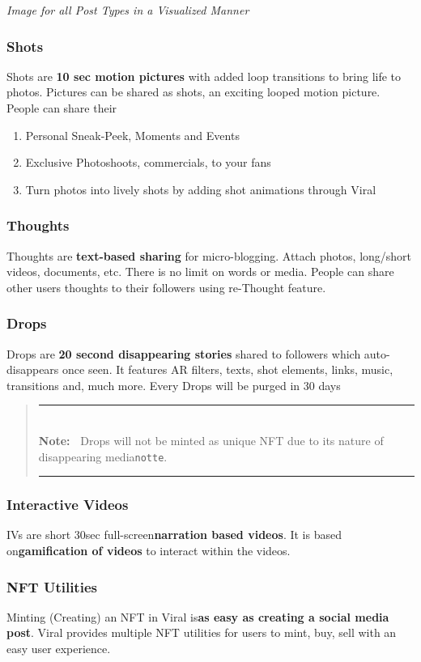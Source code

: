 \documentclass[10pt]{article}
\newlength{\Lnote}
\newcommand{\notte}[1]
     {\addtolength{\leftmargini}{1em}
        \settowidth{\Lnote}{\textbf{Note:~}}
        \begin{quote}
            \rule{\dimexpr\textwidth-2\leftmargini}{1pt}\\
                        \mbox{}\hspace{-\Lnote}\textbf{Note:~}%
                                            #1\\[-0.5ex] 
            \rule{\dimexpr\textwidth-2\leftmargini}{1pt}
        \end{quote}
        \addtolength{\leftmargini}{-4em}}
\begin{document}
\textit{Image for all Post Types in a Visualized Manner}

\subsubsection{Shots}

Shots are \textbf{10 sec motion pictures} with added loop transitions to bring life to photos. Pictures can be shared as shots, an exciting looped motion picture.\\

People can share their
\begin{enumerate}
\item Personal Sneak-Peek, Moments and Events
\item Exclusive Photoshoots, commercials, to your fans
\item Turn photos into lively shots by adding shot animations through Viral
\end{enumerate}

\subsubsection{Thoughts}
Thoughts are \textbf{text-based sharing} for micro-blogging. Attach photos, long/short videos, documents, etc. There is no limit on words or media. People can share other users thoughts to their followers using re-Thought feature.

\subsubsection{Drops}
Drops are \textbf{20 second disappearing stories} shared to followers which auto-disappears once seen. It features AR filters, texts, shot elements, links, music, transitions and, much more. Every Drops will be purged in 30 days\\

\notte{Drops will not be minted as unique NFT due to it\textsc{\char13}s nature of disappearing media\texttt{notte}.}

\subsubsection{Interactive Videos}
IVs are short 30sec full-screen\textbf{narration based videos}. It is based on\textbf{gamification of videos} to interact within the videos.

\subsubsection{NFT Utilities}
Minting (Creating) an NFT in Viral is\textbf{as easy as creating a social media post}. Viral provides multiple NFT utilities for users to mint, buy, sell with an easy user experience.
\end{document}
